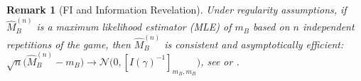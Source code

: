 \documentclass[letterpaper, 10 pt, conference]{ieeeconf}
\newcommand{\E}{\mathbb E}
\newtheorem{remark}{Remark}
\newcommand{\rh}[1]{\textcolor{purple}{\textsf{[RH: #1]}}}
\newcommand{\dr}[1]{\textcolor{red}{\textsf{[DR: #1]}}}
\begin{document}

\begin{remark}[FI and Information Revelation]\label{rem:AF_obj}Under regularity assumptions, if \(\widehat M_B^{(n)}\) is a maximum likelihood estimator (MLE) of $m_B$ based on $n$ independent repetitions of the game, %
    then \(\widehat M_B^{(n)}\) is consistent and asymptotically efficient:
        $\sqrt{n}\big(\widehat{M}_B^{(n)} - m_B \big) \to \mathcal{N}\big(0,[I(\gamma)^{-1}]_{m_B,m_B}\big)$, see  \cite[Theorem~2.8]{kutoyants2013statistical} or  \cite[Theorem 5.1]{lehmann1998theory}.      
    
\end{remark}
\end{document}
